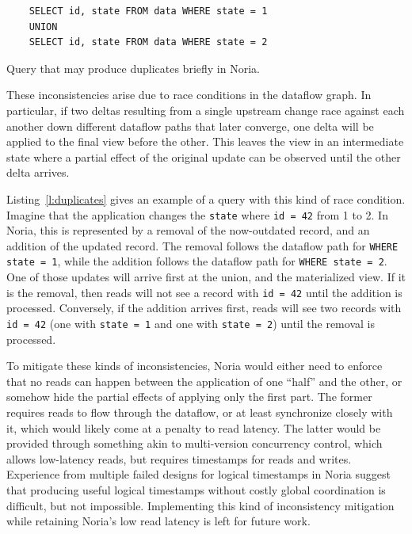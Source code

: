 \begin{listing}[h]
  \begin{verbatim}
    SELECT id, state FROM data WHERE state = 1
    UNION
    SELECT id, state FROM data WHERE state = 2
  \end{verbatim}
  \caption{Query that may produce duplicates briefly in Noria.}
  \label{l:duplicates}
\end{listing}

These inconsistencies arise due to race conditions in the dataflow graph. In
particular, if two deltas resulting from a single upstream change race against
each another down different dataflow paths that later converge, one delta will
be applied to the final view before the other. This leaves the view in an
intermediate state where a partial effect of the original update can be observed
until the other delta arrives.

Listing~\vref{l:duplicates} gives an example of a query with this kind of race
condition. Imagine that the application changes the \texttt{state} where
\texttt{id = 42} from 1 to 2. In Noria, this is represented by a removal of the
now-outdated record, and an addition of the updated record. The removal follows
the dataflow path for \texttt{WHERE state = 1}, while the addition follows the
dataflow path for \texttt{WHERE state = 2}. One of those updates will arrive
first at the union, and the materialized view. If it is the removal, then reads
will not see a record with \texttt{id = 42} until the addition is processed.
Conversely, if the addition arrives first, reads will see two records with
\texttt{id = 42} (one with \texttt{state = 1} and one with \texttt{state = 2})
until the removal is processed.

To mitigate these kinds of inconsistencies, Noria would either need to enforce
that no reads can happen between the application of one ``half'' and the other,
or somehow hide the partial effects of applying only the first part. The former
requires reads to flow through the dataflow, or at least synchronize closely
with it, which would likely come at a penalty to read latency. The latter would
be provided through something akin to multi-version concurrency control, which
allows low-latency reads, but requires timestamps for reads and writes.
Experience from multiple failed designs for logical timestamps in Noria suggest
that producing useful logical timestamps without costly global coordination is
difficult, but not impossible. Implementing this kind of inconsistency
mitigation while retaining Noria's low read latency is left for future work.

